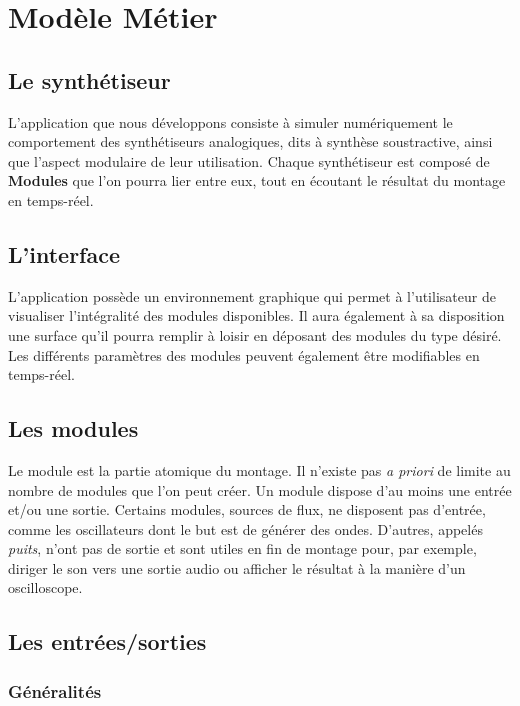 \section{Modèle Métier}

\subsection{Le synthétiseur}

L'application que nous développons consiste à simuler numériquement
le comportement des synthétiseurs analogiques, dits à synthèse
soustractive, ainsi que l'aspect modulaire de leur utilisation.
Chaque synthétiseur est composé de \textbf{Modules} que l'on
pourra lier entre eux, tout en écoutant le résultat du
montage en temps-réel.

\subsection{L'interface}

L'application possède un environnement graphique qui permet à
l'utilisateur de visualiser l'intégralité des modules disponibles.
Il aura également à sa disposition une surface qu'il pourra remplir
à loisir en déposant des modules du type désiré. Les différents
paramètres des modules peuvent également être modifiables en
temps-réel.

\subsection{Les modules}

Le module est la partie atomique du montage. Il n'existe pas \emph{a
priori} de limite au nombre de modules que l'on peut créer. Un
module dispose d'au moins une entrée et/ou une sortie. Certains
modules, sources de flux, ne disposent pas d'entrée, comme les
oscillateurs dont le but est de générer des ondes. D'autres, appelés
\emph{puits}, n'ont pas de sortie et sont utiles en fin de
montage pour, par exemple, diriger le son vers une sortie audio ou
afficher le résultat à la manière d'un oscilloscope.

\subsection{Les entrées/sorties}

\subsubsection{Généralités}
\label{ports-virtuels}


